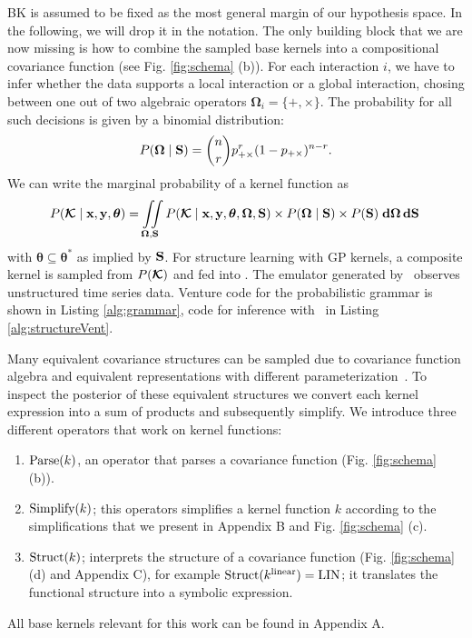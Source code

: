 BK is assumed to be fixed as the most general margin of our hypothesis space.
In the following, we will drop it in the notation.
The only building block that we are now missing is how to combine the sampled
base kernels into a compositional covariance function (see Fig. \ref{fig:schema}
(b)). For each interaction $i$, we
have to infer whether the data supports a local interaction or a global interaction,
chosing between one out of two algebraic operators
$\bm{\Omega}_i=\{+,\times\}$. The probability for all such decisions is given by a binomial distribution: 
\begin{equation}
P(\bm{\Omega} \mid \mathbf{S})= {n \choose r}  p_{+\times}^r (1 - p_{+\times})^{n-r}.
\end{equation}
We can write the marginal probability of a kernel function as 
\begin{equation}
P(\bm{\mathcal{K}} \mid \mathbf{x},\mathbf{y},\bm{\theta} ) = \iint \limits_{\bm{\Omega},\mathbf{S}}
P(\bm{\mathcal{K}} \mid \mathbf{x},\mathbf{y},\bm{\theta},\bm{\Omega},\mathbf{S}) \times P(\bm{\Omega} \mid \mathbf{S})\times
P(\mathbf{S})\; \text{\bf d}\bm{\Omega}\, \text{\bf d}\mathbf{S}\,
\end{equation}
with $\bm{\theta}\subseteq \bm{\theta}^*$ as implied by $\mathbf{S}$.
For structure learning with \ac{GP} kernels, a composite kernel is
sampled from $P(\bm{\mathcal{K}})$ and fed into \gpmem. 
The emulator generated by \gpmem\ observes unstructured time series data.
Venture code for the probabilistic grammar is shown in Listing
\ref{alg:grammar}, code for inference with \gpmem\ in Listing
\ref{alg:structureVent}. 







Many equivalent covariance structures can be sampled due to covariance function algebra
and equivalent representations with different parameterization~\citep{lloyd2014automatic}.
To inspect the posterior of these equivalent structures we convert each kernel expression
into a sum of products and subsequently simplify. 
We introduce three different operators that work on kernel functions:
\begin{enumerate}
\item $\text{Parse}(k)$, an operator that parses a covariance function (Fig.
\ref{fig:schema} (b)). 
\item $\text{Simplify}(k)$; this operators simplifies a kernel function $k$ according
to the simplifications that we present in Appendix B and Fig.
\ref{fig:schema} (c).
\item $\text{Struct}(k)$; interprets the structure of a covariance function (Fig.
\ref{fig:schema} (d) and Appendix C), for
example $\text{Struct}(k^\text{linear})=\text{LIN}$; it translates the functional structure
into a symbolic expression. 
\end{enumerate}
All base kernels relevant for this work can be found in Appendix A.



